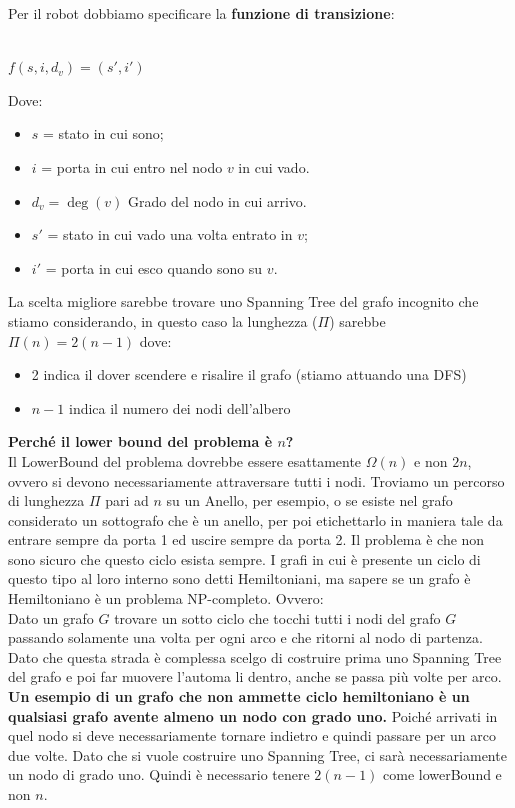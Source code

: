Per il robot dobbiamo specificare la \textbf{funzione di transizione}:\\\\
\begin{center}
    $f(s,i,d_v) = (s',i')$
\end{center}

Dove:
\begin{itemize}
    \item $s$ = stato in cui sono;
    \item $i$ = porta in cui entro nel nodo $v$ in cui vado.
    \item $d_v = \deg(v)$ Grado del nodo in cui arrivo.
    \item $s'$ = stato in cui vado una volta entrato in $v$;
    \item $i'$ = porta in cui esco quando sono su $v$.
\end{itemize}

La scelta migliore sarebbe trovare uno Spanning Tree del grafo incognito che
stiamo considerando, in questo caso la lunghezza ($\Pi$) sarebbe $\Pi(n) =
    2(n-1)$ dove:
\begin{itemize}
    \item 2 indica il dover scendere e risalire il grafo (stiamo attuando una DFS)
    \item $n-1$ indica il numero dei nodi dell'albero
\end{itemize}
\textbf{Perché il lower bound del problema è $n$?}\\
Il LowerBound del problema dovrebbe essere esattamente $\Omega(n)$ e non $2n$,
ovvero si devono necessariamente attraversare tutti i nodi. Troviamo un percorso
di lunghezza $\Pi$ pari ad $n$ su un Anello, per esempio, o se esiste nel grafo
considerato un sottografo che è un anello, per poi etichettarlo in maniera tale
da entrare sempre da porta 1 ed uscire sempre da porta 2. Il problema è che non
sono sicuro che questo ciclo esista sempre. I grafi in cui è presente un ciclo
di questo tipo al loro interno sono detti Hemiltoniani, ma sapere se un grafo è
Hemiltoniano è un problema NP-completo. Ovvero:\\ Dato un grafo $G$ trovare un
sotto ciclo che tocchi tutti i nodi del grafo $G$ passando solamente una volta per
ogni arco e che ritorni al nodo di partenza.\\
Dato che questa strada è complessa scelgo di costruire prima uno Spanning Tree
del grafo e poi far muovere l'automa li dentro, anche se passa più volte per
arco. \\\textbf{Un esempio di un grafo che non ammette ciclo hemiltoniano è un
    qualsiasi grafo avente almeno un nodo con grado uno.} Poiché arrivati in quel
nodo si deve necessariamente tornare indietro e quindi passare per un arco due
volte. Dato che si vuole costruire uno Spanning Tree, ci sarà necessariamente un
nodo di grado uno. Quindi è necessario tenere $2(n-1)$ come lowerBound e non
$n$.


